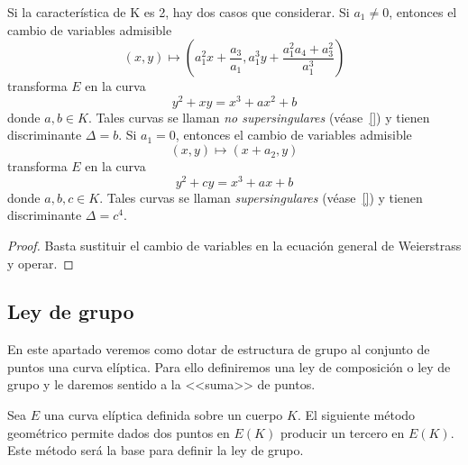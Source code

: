 \begin{lema}\label{lm:ecuaciones curva eliptica caracteristica dos}
	Si la característica de K es 2, hay dos casos que considerar. Si $a_1 \neq 0$, entonces el cambio de variables admisible
	$$
	(x, y) \mapsto \left(a_1^2 x + \frac{a_3}{a_1}, a_1^3 y + \frac{a_1^2 a_4 + a_3^2}{a_1^3} \right)
	$$
	transforma $E$ en la curva
	\begin{equation*}
		y^2 + xy = x^3 + a x^2 + b
	\end{equation*}
	donde $a, b \in K$. Tales curvas se llaman \emph{no supersingulares} (véase~\ref{}) y tienen discriminante $\Delta = b$. Si $a_1 = 0$, entonces el cambio de variables admisible
	$$
	(x, y) \mapsto (x + a_2, y)
	$$
	transforma $E$ en la curva
	\begin{equation*}
		y^2 + c y = x^3 + a x + b
	\end{equation*}
	donde $a, b, c \in K$. Tales curvas se llaman \emph{supersingulares} (véase~\ref{}) y tienen discriminante $\Delta = c^4$.
\end{lema}
\begin{proof}
	Basta sustituir el cambio de variables en la ecuación general de Weierstrass y operar.
\end{proof}


\subsection{Ley de grupo}
\label{sub:Ley de grupo}

En este apartado veremos como dotar de estructura de grupo al conjunto de puntos una curva elíptica. Para ello definiremos una ley de composición o ley de grupo y le daremos sentido a la <<suma>> de puntos.

Sea $E$ una curva elíptica definida sobre un cuerpo $K$. El siguiente método geométrico permite dados dos puntos en $E(K)$ producir un tercero en $E(K)$. Este método será la base para definir la ley de grupo.

